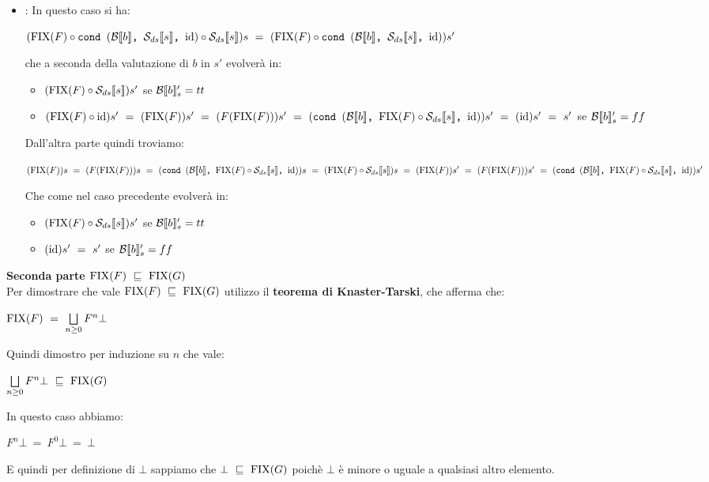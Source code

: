 {\begin{itemize}
\begin{itemize}
			\item {}: In questo caso si ha:
			\begin{center}
			$(\fixp{F} \circ \cond{b}{\Sds{}}{\idDS} \circ{} \Sds{})s~=~
			(\fixp{F} \circ \cond{b}{\Sds{}}{\idDS})s'$
			\end{center}
			che a seconda della valutazione di $b$ in $s'$ evolverà in:
			\begin{itemize}
			\item $(\fixp{F} \circ \Sds{})s'$ se $\evalBbs{b}{s'}=tt$
			\item $(\fixp{F} \circ \idDS)s'~=~(\fixp{F})s'~=~(F(\fixp{F}))s'~=~
			(\cond{b}{\fixp{F} \circ{} \Sds{}}{\idDS})s'~=~(\idDS{})s'~=~s'$ se 
			$\evalBbs{b}{s'}=ff$
			\end{itemize}
			Dall'altra parte quindi troviamo:
			\begin{center}
			$(\fixp{F})s~=~(F(\fixp{F}))s~=~(\cond{b}{\fixp{F} \circ{} 
			\Sds{}}{\idDS})s~=~(\fixp{F} \circ{} \Sds{})s~=~(\fixp{F})s'~=~
			(F(\fixp{F}))s'~=~(\cond{b}{\fixp{F} \circ{} \Sds{}}{\idDS})s'$
			\end{center}
			Che come nel caso precedente evolverà in:
			\begin{itemize}
			\item $(\fixp{F} \circ \Sds{})s'$ se $\evalBbs{b}{s'}=tt$
			\item $(\idDS{})s'~=~s'$ se $\evalBbs{b}{s'}=ff$
			\end{itemize}
		\end{itemize}
	\end{itemize}

	\textbf{Seconda parte $\fixp{F}~\mineq~\fixp{G}$}\\
	Per dimostrare che vale $\fixp{F}~\mineq~\fixp{G}$ utilizzo il
	\textbf{teorema di Knaster-Tarski}, che afferma che:
	\begin{center}
	$\fixp{F}~=~\unionsem{n}F^{n}\bot$
	\end{center}
	Quindi dimostro per induzione su $n$ che vale:
	\begin{center}
	$\unionsem{n}F^{n}\bot~\mineq~\fixp{G}$
	\end{center}

	 In questo caso abbiamo:
	\begin{center}
	$F^{n}\bot~=~F^{0}\bot~=~\bot$
	\end{center}
	E quindi per definizione di $\bot$ sappiamo che $\bot~\mineq~\fixp{G}$
	poichè $\bot$ è minore o uguale a qualsiasi altro elemento.

}
